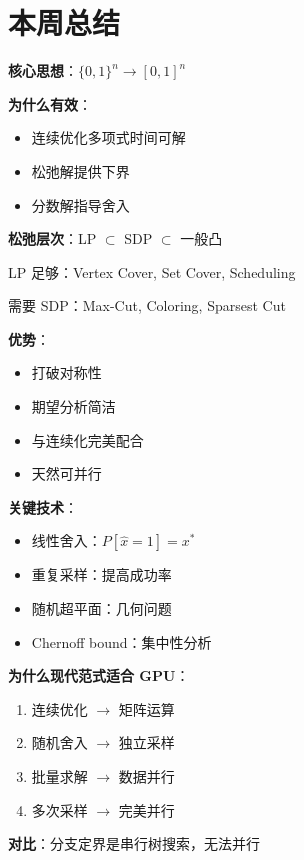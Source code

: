 \documentclass[12pt, a4paper]{ctexart}
\begin{document}
\section{本周总结}

\begin{keypoint}[连续化的威力]

\textbf{核心思想}：$\{0,1\}^n \to [0,1]^n$

\textbf{为什么有效}：
\begin{itemize}
    \item 连续优化多项式时间可解
    \item 松弛解提供下界
    \item 分数解指导舍入
\end{itemize}

\textbf{松弛层次}：LP $\subset$ SDP $\subset$ 一般凸

LP 足够：Vertex Cover, Set Cover, Scheduling

需要 SDP：Max-Cut, Coloring, Sparsest Cut

\end{keypoint}

\begin{keypoint}[随机化的威力]

\textbf{优势}：
\begin{itemize}
    \item 打破对称性
    \item 期望分析简洁
    \item 与连续化完美配合
    \item 天然可并行
\end{itemize}

\textbf{关键技术}：
\begin{itemize}
    \item 线性舍入：$P[\hat{x}=1] = x^*$
    \item 重复采样：提高成功率
    \item 随机超平面：几何问题
    \item Chernoff bound：集中性分析
\end{itemize}

\end{keypoint}

\begin{keypoint}

\textbf{为什么现代范式适合 GPU}：
\begin{enumerate}
    \item 连续优化 $\to$ 矩阵运算
    \item 随机舍入 $\to$ 独立采样
    \item 批量求解 $\to$ 数据并行
    \item 多次采样 $\to$ 完美并行
\end{enumerate}

\textbf{对比}：分支定界是串行树搜索，无法并行

\end{keypoint}
\end{document}
